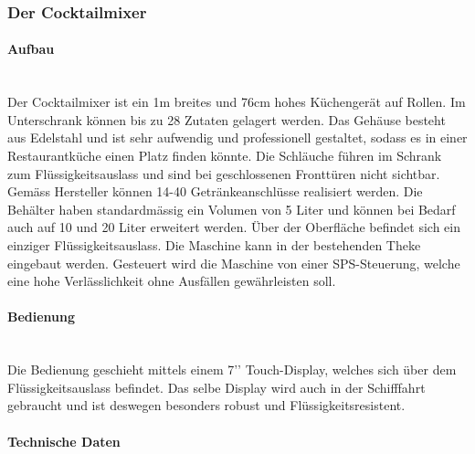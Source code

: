 \subsubsection{Der Cocktailmixer}\label{subsubsec:Der_Cocktailmixer}
\paragraph{Aufbau}\label{subsubsec:Aufbau_Der_Cocktailmixer}\mbox{}\\

Der Cocktailmixer ist ein 1m breites und 76cm hohes Küchengerät auf Rollen. Im Unterschrank können bis zu 28 Zutaten gelagert werden. Das Gehäuse besteht aus Edelstahl und ist sehr aufwendig und professionell gestaltet, sodass es in einer Restaurantküche einen Platz finden könnte. Die Schläuche führen im Schrank zum Flüssigkeitsauslass und sind bei geschlossenen Fronttüren nicht sichtbar. Gemäss Hersteller können 14-40 Getränkeanschlüsse realisiert werden. Die Behälter haben standardmässig ein Volumen von 5 Liter und können bei Bedarf auch auf 10 und 20 Liter erweitert werden. Über der Oberfläche befindet sich ein einziger Flüssigkeitsauslass. Die Maschine kann in der bestehenden Theke eingebaut werden. Gesteuert wird die Maschine von einer SPS-Steuerung, welche eine hohe Verlässlichkeit ohne Ausfällen gewährleisten soll.\cite{bg_innovation_cocktailmaschine_nodate}

\paragraph{Bedienung}\label{subsubsec:Bedienung_Der_Cocktailmixer}\mbox{}\\

Die Bedienung geschieht mittels einem 7’’ Touch-Display, welches sich über dem Flüssigkeitsauslass befindet. Das selbe Display wird auch in der Schifffahrt gebraucht und ist deswegen besonders robust und Flüssigkeitsresistent.\cite{bg_innovation_cocktailmaschine_nodate}

\paragraph{Technische Daten}\label{subsubsec:Technische_Daten_Der_Cocktailmixer}\mbox{}\\

